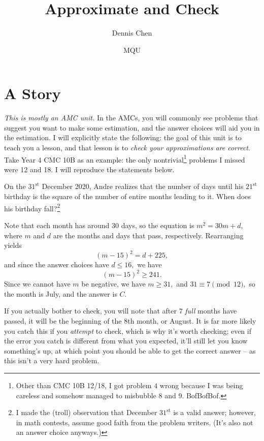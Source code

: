 \documentclass[mast]{lucky}
\title{Approximate and Check}
\author{Dennis Chen}
\date{MQU}
\begin{document}
\maketitle

\section{A Story}

\emph{This is mostly an AMC unit.} In the AMCs, you will commonly see problems that suggest you want to make some estimation, and the answer choices will aid you in the estimation. I will explicitly state the following: the goal of this unit is to teach you a lesson, and that lesson is to \emph{check your approximations are correct}. Take Year 4 CMC 10B as an example: the only nontrivial\footnote{Other than CMC 10B 12/18, I got problem $4$ wrong because I was being careless and somehow managed to misbubble 8 and 9. BofBofBof.} problems I missed were 12 and 18. I will reproduce the statements below.

\begin{exam}[CMC 10B 2021/12]
On the $31^{\text{st}}$ December 2020, Andre realizes that the number of days until his $21^{\text{st}}$ birthday is the square of the number of entire months leading to it. When does his birthday fall?\footnote{I made the (troll) observation that December $31^{\text{st}}$ is a valid answer; however, in math contests, assume good faith from the problem writers. (It's also not an answer choice anyways.)}

\end{exam}

\begin{sol}[(Bogus)]
Note that each month has around $30$ days, so the equation is $m^2=30m+d,$ where $m$ and $d$ are the months and days that pass, respectively. Rearranging yields
\[(m-15)^2=d+225,\]
and since the answer choices have $d\leq 16,$ we have
\[(m-15)^2\geq 241.\]
Since we cannot have $m$ be negative, we have $m\geq 31,$ and $31\equiv 7\pmod{12},$ so the month is July, and the answer is $C.$
\end{sol}

If you actually bother to check, you will note that after $7$ \emph{full} months have passed, it will be the beginning of the $8$th month, or August. It is far more likely you catch this if you \textit{attempt} to check, which is why it's worth checking; even if the error you catch is different from what you expected, it'll still let you know something's up, at which point you should be able to get the correct answer -- as this isn't a very hard problem.
\end{document}
